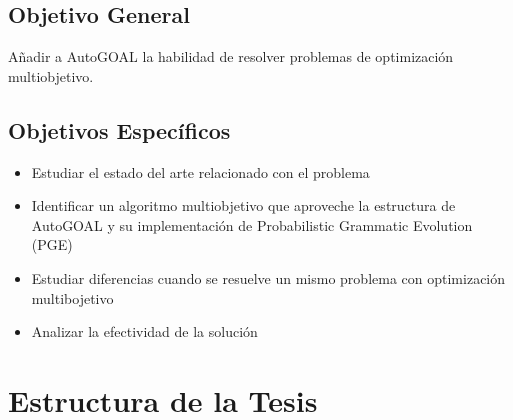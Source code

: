 \subsection*{Objetivo General}
Añadir a AutoGOAL la habilidad de resolver problemas de optimizaci\'on multiobjetivo.
\subsection*{Objetivos Espec\'ificos}
\begin{itemize}
    \item Estudiar el estado del arte relacionado con el problema
    \item Identificar un algoritmo multiobjetivo que aproveche la estructura de AutoGOAL y su implementaci\'on de Probabilistic Grammatic Evolution (PGE)
    \item Estudiar diferencias cuando se resuelve un mismo problema con optimizaci\'on multibojetivo
    \item Analizar la efectividad de la soluci\'on
\end{itemize}

\section*{Estructura de la Tesis}
